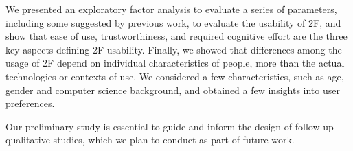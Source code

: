 \documentclass[conference]{IEEEtran}
\begin{document}
We presented an exploratory factor analysis to evaluate a series of parameters, including some suggested by previous work, to evaluate the usability of 2F, and show that ease of use, trustworthiness, and required cognitive effort are the three key aspects defining 2F usability. Finally, we showed that differences among the usage of 2F depend on individual characteristics of people, more than the actual technologies or contexts of use. We considered a few characteristics, such as age, gender and computer science background, and obtained a few insights into user preferences. 

Our preliminary study is essential to guide and inform the design of follow-up qualitative studies, which we plan to conduct as part of future work.





\balance


\end{document}
